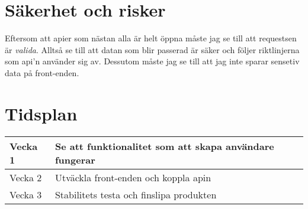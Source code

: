 \documentclass{article}
\begin{document}
    \section{Säkerhet och risker}
        Eftersom att apier som nästan alla är helt öppna måste jag se till att requestsen är \textit{valida}. Alltså se till att datan som blir passerad är säker och följer riktlinjerna som api'n använder sig av. Dessutom måste jag se till att jag inte sparar sensetiv data på front-enden.
    \section{Tidsplan}
       


      \begin{center}
        \begin{tabular}{ |p{1cm}|p{3cm}|} 

    
            \hline
            Vecka 1 & Se att funktionalitet som att skapa användare fungerar \\
            \hline
            Vecka 2 & Utväckla front-enden och koppla apin  \\ 
             \hline
            Vecka 3 & Stabilitets testa och finslipa produkten \\ 
            \hline
           \end{tabular}
      \end{center}
\end{document}
